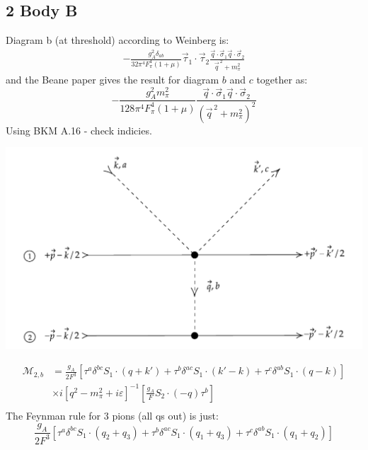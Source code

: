 \documentclass[11pt]{article}
\newcommand\ddfrac[2]{\frac{\displaystyle #1}{\displaystyle #2}}
\newcommand\mm{\mathcal{M}}
\newcommand{\mpi}{m_\pi}
\begin{document}
\subsection{2 Body B}
Diagram b (at threshold) according to Weinberg is:
\begin{align}
    - \frac{g_A^2 \delta_{ab}}{32 \pi^4 F_\pi^4 (1+\mu)} \vec{\tau}_1 \cdot \vec{\tau}_2
    \ddfrac{\vec{q}\cdot \vec{\sigma}_1 \vec{q} \cdot \vec{\sigma}_2}{\vec{q}^{\,2} + m_\pi^2} 
\end{align}
and the Beane paper gives the result for diagram $b$ and $c$ together as:
\begin{equation}
    - \frac{g_A^2 m_\pi^2}{128 \pi^4 F_\pi^4 (1+\mu)} 
    \ddfrac{\vec{q}\cdot \vec{\sigma}_1 \vec{q} \cdot \vec{\sigma}_2}{(\vec{q}^{\,2} + m_\pi^2)^2} 
\end{equation}
Using BKM A.16 - check indicies.
\begin{center}
    \includegraphics[scale=0.9]{2b.pdf}
\end{center}
\begin{align}
\mm_{2,b}&=\frac{g_A}{2F^3} \left[ \tau^a \delta^{bc} S_1 \cdot(q+k') + \tau^b \delta^{ac} S_1 \cdot(k'-k)+ \tau^c \delta^{ab} S_1 \cdot \left( q-k \right)\right]\nonumber\\
             &\times i \left[ q^2-\mpi^2 +i \varepsilon \right]^{-1} \left[ \frac{g_A}{F} S_2\cdot(-q) \tau^b \right]\\
\end{align}
The Feynman rule for 3 pions (all qs out) is just:
\begin{equation}
    \frac{g_A}{2F^3}\left[ \tau^a \delta^{bc} S_1 \cdot(q_2+q_3) + \tau^b \delta^{ac} S_1 \cdot(q_1+q_3)+ \tau^c \delta^{ab} S_1 \cdot \left(q_1+q_2\right)\right]
\end{equation}
\end{document}
